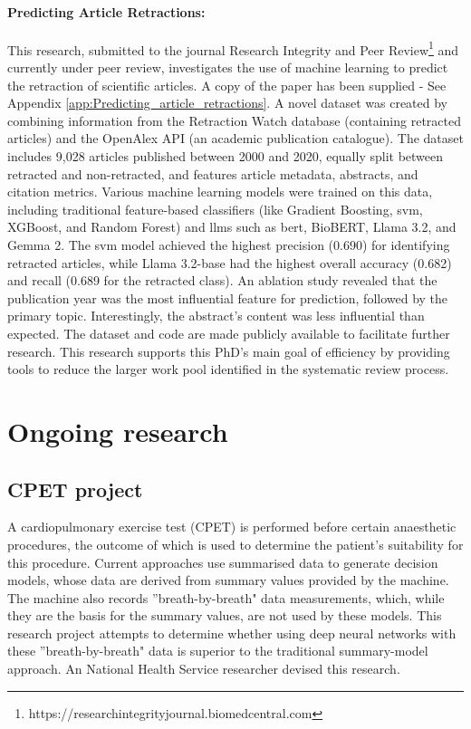 \documentclass[10pt,oneside]{book}
\begin{document}
\paragraph{Predicting Article Retractions:}
This research, submitted to the journal Research Integrity and Peer Review\footnote{https://researchintegrityjournal.biomedcentral.com} and currently under peer review, investigates the use of machine learning to predict the retraction of scientific articles. A copy of the paper has been supplied - See Appendix \ref{app:Predicting_article_retractions}. A novel dataset was created by combining information from the Retraction Watch database (containing retracted articles) and the OpenAlex API (an academic publication catalogue). The dataset includes 9,028 articles published between 2000 and 2020, equally split between retracted and non-retracted, and features article metadata, abstracts, and citation metrics. Various machine learning models were trained on this data, including traditional feature-based classifiers (like Gradient Boosting, \gls*{svm}, XGBoost, and Random Forest) and \glspl*{llm} such as \gls*{bert}, BioBERT, Llama 3.2, and Gemma 2. The \gls*{svm} model achieved the highest precision (0.690) for identifying retracted articles, while Llama 3.2-base had the highest overall accuracy (0.682) and recall (0.689 for the retracted class). An ablation study revealed that the publication year was the most influential feature for prediction, followed by the primary topic. Interestingly, the abstract's content was less influential than expected. The dataset and code are made publicly available to facilitate further research. This research supports this PhD's main goal of efficiency by providing tools to reduce the larger work pool identified in the systematic review process.

\section{Ongoing research}

\subsection{CPET project}

A cardiopulmonary exercise test (CPET) is performed before certain anaesthetic procedures, the outcome of which is used to determine the patient's suitability for this procedure. Current approaches use summarised data to generate decision models, whose data are derived from summary values provided by the machine. The machine also records ''breath-by-breath" data measurements, which, while they are the basis for the summary values, are not used by these models. This research project attempts to determine whether using deep neural networks with these ''breath-by-breath" data is superior to the traditional summary-model approach. An National Health Service researcher devised this research.
\end{document}
